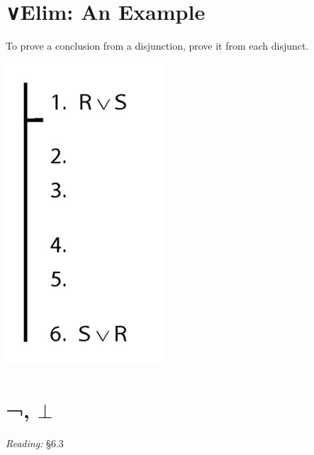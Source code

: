 \documentclass[12pt]{extarticle}
\begin{document}
\begin{multicols*}{3}
 
\section{∨Elim: An Example}
 
To prove a conclusion from a disjunction, prove it from each disjunct.
 
\begin{center}
\includegraphics[scale=0.3]{img/proof_disjunction_elim.png}
\end{center}
 
 
\section{¬, $\bot$}
 
\emph{Reading:} §6.3
 

\end{multicols*}
\end{document}
